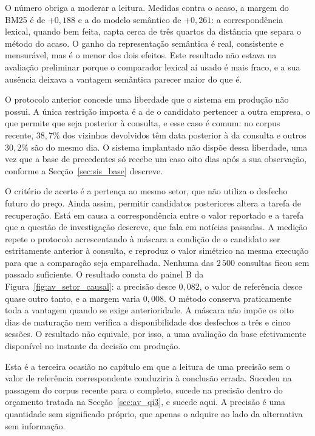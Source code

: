 O número obriga a moderar a leitura. Medidas contra o acaso, a margem do BM25 é de $+0{,}188$ e a do
modelo semântico de $+0{,}261$: a correspondência lexical, quando bem feita, capta cerca de três
quartos da distância que separa o método do acaso. O ganho da representação semântica é real,
consistente e mensurável, mas é o menor dos dois efeitos. Este resultado não estava na avaliação
preliminar porque o comparador lexical aí usado é mais fraco, e a sua ausência deixava a vantagem
semântica parecer maior do que é.

O protocolo anterior concede uma liberdade que o sistema em produção não possui. A única restrição
imposta é a de o candidato pertencer a outra empresa, o que permite que seja posterior à consulta, e
esse caso é comum: no corpus recente, $38{,}7\%$ dos vizinhos devolvidos têm data posterior à da
consulta e outros $30{,}2\%$ são do mesmo dia. O sistema implantado não dispõe dessa liberdade, uma
vez que a base de precedentes só recebe um caso oito dias após a sua observação, conforme a
Secção~\ref{sec:sis_base} descreve.

O critério de acerto é a pertença ao mesmo setor, que não utiliza o desfecho futuro do preço.
Ainda assim, permitir candidatos posteriores altera a tarefa de recuperação. Está em causa a correspondência
entre o valor reportado e a tarefa que a questão de investigação descreve, que fala em notícias
passadas. A medição repete o protocolo acrescentando à máscara a condição de o candidato ser
estritamente anterior à consulta, e reproduz o valor simétrico na mesma execução para que a
comparação seja emparelhada. Nenhuma das $2\,500$ consultas ficou sem passado suficiente. O
resultado consta do painel B da Figura~\ref{fig:av_setor_causal}: a precisão desce $0{,}082$, o valor
de referência desce quase outro tanto, e a margem varia $0{,}008$. O método conserva praticamente
toda a vantagem quando se exige anterioridade. A máscara não impõe os oito dias de maturação nem
verifica a disponibilidade dos desfechos a três e cinco sessões. O resultado não equivale, por isso,
a uma avaliação da base efetivamente disponível no instante da decisão em produção.

Esta é a terceira ocasião no capítulo em que a leitura de uma precisão sem o valor de referência
correspondente conduziria à conclusão errada. Sucedeu na passagem do corpus recente para o completo,
sucede na precisão dentro do orçamento tratada na Secção~\ref{sec:av_qi3}, e sucede aqui. A precisão
é uma quantidade sem significado próprio, que apenas o adquire ao lado da alternativa sem informação.

